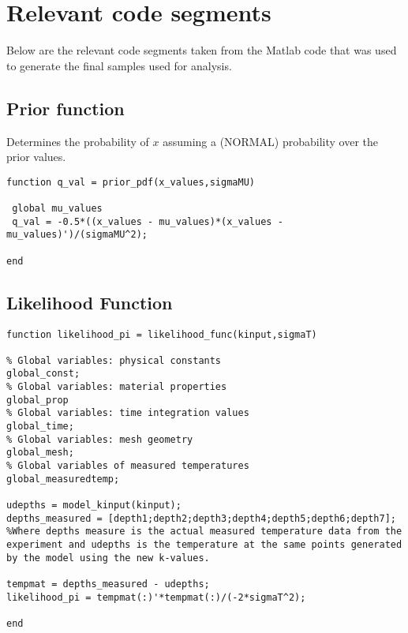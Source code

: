 \chapter{Relevant code segments} \label{codeapp}
Below are the relevant code segments taken from the Matlab code that was used to generate the final samples used for analysis.

\section*{Prior function}
Determines the probability of $x$ assuming a (NORMAL) probability over the prior values.
\begin{lstlisting}
function q_val = prior_pdf(x_values,sigmaMU)

 global mu_values
 q_val = -0.5*((x_values - mu_values)*(x_values - mu_values)')/(sigmaMU^2);

end

\end{lstlisting}
\section*{Likelihood Function}

\begin{lstlisting}
function likelihood_pi = likelihood_func(kinput,sigmaT)

% Global variables: physical constants
global_const;
% Global variables: material properties
global_prop
% Global variables: time integration values
global_time;
% Global variables: mesh geometry
global_mesh;
% Global variables of measured temperatures
global_measuredtemp;

udepths = model_kinput(kinput);
depths_measured = [depth1;depth2;depth3;depth4;depth5;depth6;depth7];
%Where depths measure is the actual measured temperature data from the experiment and udepths is the temperature at the same points generated by the model using the new k-values.

tempmat = depths_measured - udepths;
likelihood_pi = tempmat(:)'*tempmat(:)/(-2*sigmaT^2);

end

\end{lstlisting}
